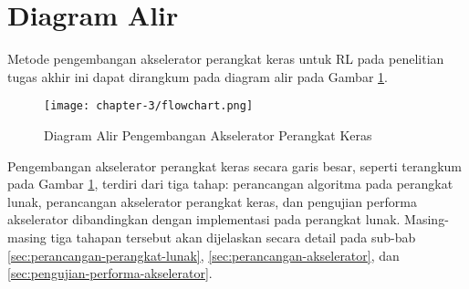 \section{Diagram Alir}

Metode pengembangan akselerator perangkat keras untuk \ac{RL} pada penelitian tugas akhir ini dapat dirangkum pada diagram alir pada Gambar \ref{fig:flowchart-pengembangan}.

\begin{figure}[h]
	\centering
	\texttt{[image: chapter-3/flowchart.png]}
	\caption{Diagram Alir Pengembangan Akselerator Perangkat Keras}
	\label{fig:flowchart-pengembangan}
\end{figure}

Pengembangan akselerator perangkat keras secara garis besar, seperti terangkum pada Gambar \ref{fig:flowchart-pengembangan}, terdiri dari tiga tahap: perancangan algoritma pada perangkat lunak, perancangan akselerator perangkat keras, dan pengujian performa akselerator dibandingkan dengan implementasi pada perangkat lunak. Masing-masing tiga tahapan tersebut akan dijelaskan secara detail pada sub-bab \ref{sec:perancangan-perangkat-lunak}, \ref{sec:perancangan-akselerator}, dan \ref{sec:pengujian-performa-akselerator}.
